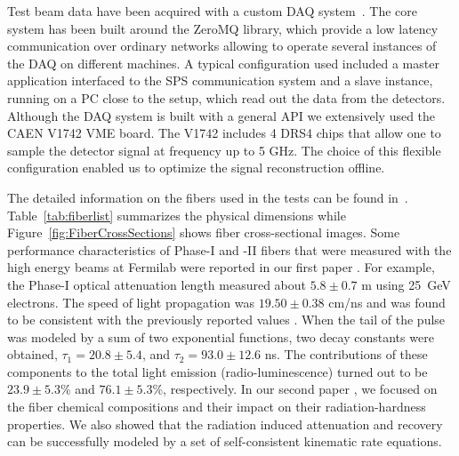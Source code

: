 \documentclass[a4paper,11pt]{article}
\begin{document}
Test beam data have been acquired with a custom DAQ system~\cite{r-MAR}. The core system has been built around the ZeroMQ library, which provide a low latency communication over ordinary networks allowing to operate several instances of the DAQ on different machines. A typical configuration used included a master application interfaced to the SPS communication system and a slave instance, running on a PC close to the setup, which read out the data from the detectors. Although the DAQ system is built with a general API we extensively used the CAEN V1742 VME board. The V1742 includes 4 DRS4 chips that allow one to sample the detector signal at frequency up to 5 GHz. The choice of this flexible configuration enabled us to optimize the signal reconstruction offline.

The detailed information on the fibers used in the tests can be found in~\cite{JINSTPaper}.  Table~\ref{tab:fiberlist} summarizes the physical dimensions while Figure~\ref{fig:FiberCrossSections} shows fiber cross-sectional images.  Some performance characteristics of Phase-I and -II fibers that were measured with the high energy beams at Fermilab were reported in our first paper \cite{JINSTPaper}.  For example, the Phase-I optical attenuation length measured about $5.8\pm0.7$ m using 25~GeV  electrons.  The speed of light propagation was $19.50\pm0.38$ cm/ns and was found to be consistent with the previously reported values \cite{Goro,Akch97}.  When the tail of the pulse was modeled by a sum of two exponential functions, two decay constants were obtained, $\tau_1= 20.8\pm5.4$, and $\tau_2= 93.0\pm12.6$ ns.  The contributions of these components to the total light emission (radio-luminescence) turned out to be $23.9\pm5.3$\% and $76.1\pm5.3$\%, respectively.  In our second paper \cite{JINSTPaper2}, we focused on the fiber chemical compositions and their impact on their radiation-hardness properties.  We also showed that the radiation induced attenuation and recovery can be successfully modeled by a set of self-consistent kinematic rate equations.
\end{document}
